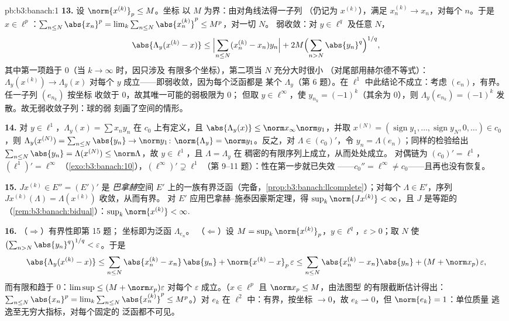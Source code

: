\begin{solution}{pb:b3:banach:1}
\textbf{13.} 设 $\norm{x^{(k)}}_p \leq M$。坐标
以 $M$ 为界：由对角线法得一子列
（仍记为 $x^{(k)}$），满足 $x^{(k)}_n \to x_n$，对每个
$n$。于是 $x \in \ell^p$：$\sum_{n\leq N}\abs{x_n}^p =
\lim_k\sum_{n\leq N}\abs{x^{(k)}_n}^p \leq M^p$，对一切 $N$。
弱收敛：对 $y \in \ell^q$ 及任意 $N$，
\[
\abs{\Lambda_y(x^{(k)} - x)} \leq
\Bigl|\sum_{n \leq N}(x^{(k)}_n - x_n)y_n\Bigr|
+ 2M\Bigl(\sum_{n>N}\abs{y_n}^q\Bigr)^{1/q},
\]
其中第一项趋于 $0$（当 $k \to \infty$ 时，因只涉及
有限多个坐标），第二项当 $N$ 充分大时很小
（对尾部用赫尔德不等式）：$\Lambda_y(x^{(k)}) \to \Lambda_y(x)$
对每个 $y$ 成立——即弱收敛，因为每个泛函都是
某个 $\Lambda_y$（第 6 题）。在 $\ell^1$ 中此结论不成立：考虑
$(e_n)$，有界。任一子列 $(e_{n_k})$ 按坐标
收敛于 $0$，故其唯一可能的弱极限为 $0$；
但取 $y \in \ell^\infty$，使 $y_{n_k} =
(-1)^k$（其余为 $0$），则 $\Lambda_y(e_{n_k}) = (-1)^k$
发散。故无弱收敛子列：球的弱
刻画了空间的情形。

\textbf{14.} 对 $y \in \ell^1$，$\Lambda_y(x) = \sum x_ny_n$
在 $c_0$ 上有定义，且 $\abs{\Lambda_y(x)} \leq \norm
x_\infty\norm y_1$，并取 $x^{(N)} =
(\operatorname{sign}y_1, \dots, \operatorname{sign}y_N, 0,
\dots) \in c_0$，则 $\Lambda_y(x^{(N)}) =
\sum_{n\leq N}\abs{y_n} \to \norm y_1$:
$\norm{\Lambda_y} = \norm y_1$。反之，对 $\Lambda \in
(c_0)'$，令 $y_n = \Lambda(e_n)$；同样的检验给出
$\sum_{n \leq N}\abs{y_n} = \Lambda(x^{(N)}) \leq
\norm\Lambda$，故 $y \in \ell^1$，且 $\Lambda = \Lambda_y$ 在
稠密的有限序列上成立，从而处处成立。
对偶链为 $(c_0)' = \ell^1$，$(\ell^1)' = \ell^\infty$
（\cref{exo:b3:banach:10}），$(\ell^\infty)' \supsetneq \ell^1$
（第 9--11 题）：性在第一步就已失效
——$c_0'' = \ell^\infty \neq c_0$——且再也没有恢复。

\textbf{15.} $J x^{(k)} \in E'' = (E')'$ 是
\emph{巴拿赫}空间 $E'$ 上的一族有界泛函（完备，\cref{prop:b3:banach:llcomplete}）；对每个
$\Lambda \in E'$，序列 $Jx^{(k)}(\Lambda) =
\Lambda(x^{(k)})$ 收敛，从而有界。
对 $E'$ 应用巴拿赫–施泰因豪斯定理，得 $\sup_k\norm{Jx^{(k)}} <
\infty$，且 $J$ 是等距的
（\cref{rem:b3:banach:bidual}）：$\sup_k\norm{x^{(k)}} <
\infty$.

\textbf{16.} （$\Rightarrow$）有界性即第 15 题；
坐标即为泛函 $\Lambda_{e_n}$。
（$\Leftarrow$）设 $M = \sup_k\norm{x^{(k)}}_p$，$y \in
\ell^q$，$\varepsilon > 0$；取 $N$ 使
$\bigl(\sum_{n>N}\abs{y_n}^q\bigr)^{1/q} < \varepsilon$。于是
\[
\abs{\Lambda_y(x^{(k)} - x)} \leq
\sum_{n\leq N}\abs{x^{(k)}_n - x_n}\,\abs{y_n} +
\norm{x^{(k)} - x}_p\,\varepsilon
\leq \sum_{n\leq N}\abs{x^{(k)}_n - x_n}\abs{y_n} +
(M + \norm x_p)\,\varepsilon,
\]
而有限和趋于 $0$：$\limsup \leq (M + \norm
x_p)\varepsilon$ 对每个 $\varepsilon$ 成立。（$x \in
\ell^p$ 且 $\norm x_p \leq M$，由法图型
的有限截断估计得出：$\sum_{n \leq N}\abs{x_n}^p =
\lim_k\sum_{n\leq N}\abs{x^{(k)}_n}^p \leq M^p$。）对 $e_k$
在 $\ell^2$ 中：有界，按坐标 $\to 0$，故 $e_k
\rightharpoonup 0$，但 $\norm{e_k} = 1$：单位质量
逃逸至无穷大指标，对每个固定的
泛函都不可见。


\end{solution}
